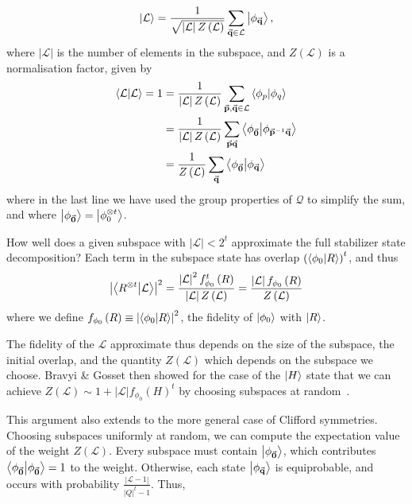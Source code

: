 \begin{equation}
\ket{\mathcal{L}} = \frac{1}{\sqrt{\left|\mathcal{L}\right|Z\left(\mathcal{L}\right)}}\sum_{\va{q}\in\mathcal{L}}\ket{\phi_{\va{q}}},
\label{eq:weight}
\end{equation}
where $\left|\mathcal{L}\right|$ is the number of elements in the subspace, and $Z\left(\mathcal{L}\right)$ is a normalisation factor, given by
\begin{align*}
\braket{\mathcal{L}}=1 &=\frac{1}{\left|\mathcal{L}\right|Z\left(\mathcal{L}\right)}\sum_{\va{p},\va{q}\in\mathcal{L}}\braket{\phi_{p}}{\phi_{q}} \nonumber \\
&=\frac{1}{\left|\mathcal{L}\right|Z\left(\mathcal{L}\right)}\sum_{\va{p}\va{q}}\braket{\phi_{\va{0}}}{\phi_{\va{p}^{-1}\va{q}}} \nonumber \\
&=\frac{1}{Z\left(\mathcal{L}\right)}\sum_{\va{q}}\braket{\phi_{\va{0}}}{\phi_{\va{q}}}
\end{align*}
where in the last line we have used the group properties of $\mathcal{Q}$ to simplify the sum, and where $\ket{\phi_{\va{0}}}=\ket{\phi_{0}^{\otimes t}}$.\par
How well does a given subspace with $\left|\mathcal{L}\right|<2^{t}$ approximate the full stabilizer state decomposition? Each term in the subspace state has overlap $\left(\braket{\phi_{0}}{R}\right)^{t}$, and thus
\begin{equation}
\left|\braket{R^{\otimes t}}{\mathcal{L}}\right|^{2}
=
\frac{\left|\mathcal{L}\right|^{2}f_{\phi_{0}}^{t}\left(R\right)}{\left|\mathcal{L}\right|Z\left(\mathcal{L}\right)}=\frac{\left|\mathcal{L}\right|f_{\phi_{0}}\left(R\right)}{Z\left(\mathcal{L}\right)}
\label{eq:incomplete_r_fidelity}
\end{equation}
where we define $f_{\phi_{0}}\left(R\right)\equiv\left|\braket{\phi_{0}}{R}\right|^{2}$, the fidelity of $\ket{\phi_{0}}$ with $\ket{R}$.\par
The fidelity of the $\mathcal{L}$ approximate thus depends on the size of the subspace, the initial overlap, and the quantity $Z\left(\mathcal{L}\right)$ which depends on the subspace we choose. Bravyi \& Gosset then showed for the case of the $\ket{H}$ state that we can achieve $Z\left(\mathcal{L}\right)\sim 1+\left|\mathcal{L}\right|f_{\phi_{0}}\left(H\right)^{t}$ by choosing subspaces at random~\cite{Bravyi2016}.\par
This argument also extends to the more general case of Clifford symmetries. Choosing subspaces uniformly at random, we can compute the expectation value of the weight $Z\left(\mathcal{L}\right)$. Every subspace must contain $\ket{\phi_{\va{0}}}$, which contributes $\braket{\phi_{\va{0}}}=1$ to the weight. Otherwise, each state $\ket{\phi_{\va{q}}}$ is equiprobable, and occurs with probability $\frac{\left|\mathcal{L}-1\right|}{\left|Q\right|^{t}-1}$. Thus,
